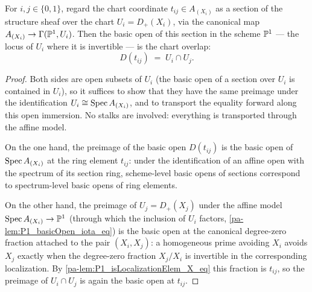 \begin{theorem}
  \label{pa-thm:P1_basicOpen_chartCoord}
  \leanok

  For \(i, j \in \{0,1\}\), regard the chart coordinate \(t_{ij} \in A_{(X_i)}\) as a
  section of the structure sheaf over the chart \(U_i = D_+(X_i)\), via the canonical map
  \(A_{(X_i)} \to \Gamma(\mathbb{P}^1, U_i)\). Then the basic open of this section in the scheme
  \(\mathbb{P}^1\) --- the locus of \(U_i\) where it is invertible --- is the chart overlap:
  \[
    D(t_{ij}) \;=\; U_i \cap U_j .
  \]
\end{theorem}
\begin{proof}
  \leanok
  Both sides are open subsets of \(U_i\) (the basic open of a section over \(U_i\) is
  contained in \(U_i\)), so it suffices to show that they have the same preimage under the
  identification \(U_i \cong \operatorname{Spec} A_{(X_i)}\), and to transport the equality forward
  along this open immersion. No stalks are involved: everything is transported through
  the affine model.

  On the one hand, the preimage of the basic open \(D(t_{ij})\) is the basic open of
  \(\operatorname{Spec} A_{(X_i)}\) at the ring element \(t_{ij}\): under the identification of an
  affine open with the spectrum of its section ring, scheme-level basic opens of sections
  correspond to spectrum-level basic opens of ring elements.

  On the other hand, the preimage of \(U_j = D_+(X_j)\) under the affine model
  \(\operatorname{Spec} A_{(X_i)} \to \mathbb{P}^1\) (through which the inclusion of \(U_i\) factors,
  \ref{pa-lem:P1_basicOpen_iota_eq}) is the basic open at the canonical degree-zero fraction
  attached to the pair \((X_i, X_j)\): a homogeneous prime avoiding \(X_i\) avoids
  \(X_j\) exactly when the degree-zero fraction \(X_j/X_i\) is invertible in the
  corresponding localization. By \ref{pa-lem:P1_isLocalizationElem_X_eq} this fraction is
  \(t_{ij}\), so the preimage of \(U_i \cap U_j\) is again the basic open at
  \(t_{ij}\).
\end{proof}

